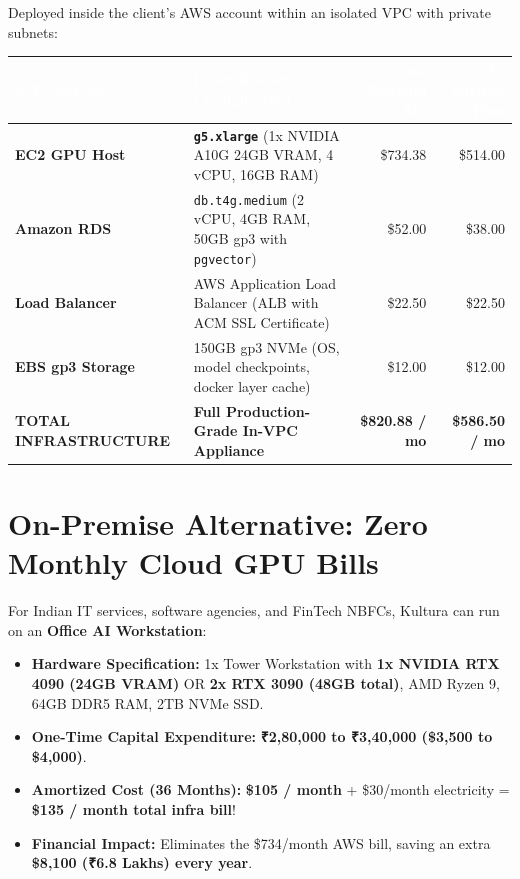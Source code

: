 \documentclass[10pt,a4paper]{article}
\begin{document}
Deployed inside the client's AWS account within an isolated VPC with private subnets:

\vspace{4pt}
\begin{tabularx}{\textwidth}{l X r r}
\toprule
\rowcolor{tableheader}
\textcolor{white}{\textbf{AWS Service}} & \textcolor{white}{\textbf{Exact Resource Configuration}} & \textcolor{white}{\textbf{On-Demand / Mo}} & \textcolor{white}{\textbf{1-Yr Savings Plan}} \\
\midrule
\textbf{EC2 GPU Host} & \textbf{\texttt{g5.xlarge}} (1x NVIDIA A10G 24GB VRAM, 4 vCPU, 16GB RAM) & \$734.38 & \$514.00 \\
\rowcolor{tablerowalt}
\textbf{Amazon RDS} & \texttt{db.t4g.medium} (2 vCPU, 4GB RAM, 50GB gp3 with \texttt{pgvector}) & \$52.00 & \$38.00 \\
\textbf{Load Balancer} & AWS Application Load Balancer (ALB with ACM SSL Certificate) & \$22.50 & \$22.50 \\
\rowcolor{tablerowalt}
\textbf{EBS gp3 Storage} & 150GB gp3 NVMe (OS, model checkpoints, docker layer cache) & \$12.00 & \$12.00 \\
\midrule
\textbf{TOTAL INFRASTRUCTURE} & \textbf{Full Production-Grade In-VPC Appliance} & \textbf{\$820.88 / mo} & \textbf{\$586.50 / mo} \\
\bottomrule
\end{tabularx}

\section{On-Premise Alternative: Zero Monthly Cloud GPU Bills}

For Indian IT services, software agencies, and FinTech NBFCs, Kultura can run on an \textbf{Office AI Workstation}:
\begin{itemize}[leftmargin=12pt, itemsep=1pt]
    \item \textbf{Hardware Specification:} 1x Tower Workstation with \textbf{1x NVIDIA RTX 4090 (24GB VRAM)} OR \textbf{2x RTX 3090 (48GB total)}, AMD Ryzen 9, 64GB DDR5 RAM, 2TB NVMe SSD.
    \item \textbf{One-Time Capital Expenditure:} \textbf{₹2,80,000 to ₹3,40,000 (\$3,500 to \$4,000)}.
    \item \textbf{Amortized Cost (36 Months):} \textbf{\$105 / month} + \$30/month electricity = \textbf{\$135 / month total infra bill}!
    \item \textbf{Financial Impact:} Eliminates the \$734/month AWS bill, saving an extra \textbf{\$8,100 (₹6.8 Lakhs) every year}.
\end{itemize}
\end{document}
